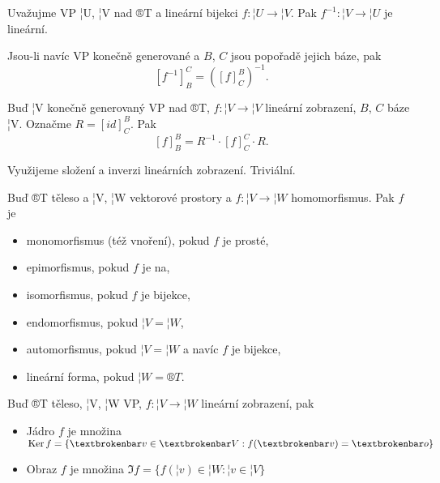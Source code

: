 \documentclass[12pt]{article}					%
\begin{document}
    \begin{tvrzeni}
        Uvažujme VP ¦U, ¦V nad ®T a lineární bijekci $f: ¦U \rightarrow ¦V$. Pak $f^{-1}: ¦V \rightarrow ¦U$ je lineární.

        Jsou-li navíc VP konečně generované a $B$, $C$ jsou popořadě jejich báze, pak
        $$ [f^{-1}]_B^C = ([f]_C^B)^{-1}. $$ 
    \end{tvrzeni}

    \begin{tvrzeni}
        Buď ¦V konečně generovaný VP nad ®T, $f: ¦V \rightarrow ¦V$ lineární zobrazení, $B$, $C$ báze ¦V. Označme $R = [id]_C^B$. Pak
        $$ [f]_B^B = R^{-1}·[f]_C^C · R. $$
        \begin{dukazin}
            Využijeme složení a inverzi lineárních zobrazení. Triviální.
        \end{dukazin}
    \end{tvrzeni}


    \begin{definice}
        Buď ®T těleso a ¦V, ¦W vektorové prostory a $f: ¦V \rightarrow ¦W$ homomorfismus. Pak $f$ je
        \begin{itemize}
                \item monomorfismus (též vnoření), pokud $f$ je prosté,
            \item epimorfismus, pokud $f$ je na,
            \item isomorfismus, pokud $f$ je bijekce,
            \item endomorfismus, pokud $¦V = ¦W$,
            \item automorfismus, pokud $¦V = ¦W$ a navíc $f$ je bijekce,
            \item lineární forma, pokud $¦W = ®T$.
        \end{itemize}
    \end{definice}

    \begin{definice}
        Buď ®T těleso, ¦V, ¦W VP, $f: ¦V \rightarrow ¦W$ lineární zobrazení, pak
        \begin{itemize}
            \item Jádro $f$ je množina $\Ker f = \{ ¦v \in ¦V: f(¦v) = ¦o\}$
            \item Obraz $f$ je množina $\Im f = \{f(¦v) \in ¦W : ¦v \in ¦V\}$
        \end{itemize}
    \end{definice}
\end{document}

